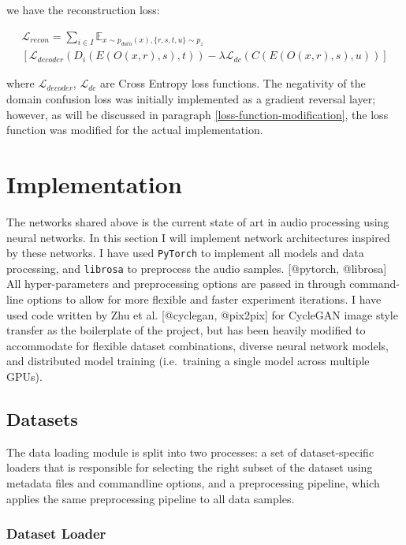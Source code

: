 \documentclass[12pt,a4paper,]{report}
\begin{document}
we have the reconstruction loss:

\begin{multline}
    \mathcal{L}_{recon} = \sum_{i \in I} \mathbb{E}_{x \sim p_{data}(x), \{r, s, t, u\} \sim p_{z}} \\
    [\mathcal{L}_{decoder}(D_i(E(O(x, r), s), t))  - \lambda \mathcal{L}_{dc}(C(E(O(x, r), s), u))] \label{eq:umtn}
\end{multline}

where \(\mathcal{L}_{decoder}\), \(\mathcal{L}_{dc}\) are Cross Entropy
loss functions. The negativity of the domain confusion loss was
initially implemented as a gradient reversal layer; however, as will be
discussed in paragraph \ref{loss-function-modification}, the loss
function was modified for the actual implementation.

\hypertarget{implementation}{%
\chapter{Implementation}\label{implementation}}

The networks shared above is the current state of art in audio
processing using neural networks. In this section I will implement
network architectures inspired by these networks. I have used
\texttt{PyTorch} to implement all models and data processing, and
\texttt{librosa} to preprocess the audio samples. {[}@pytorch,
@librosa{]} All hyper-parameters and preprocessing options are passed in
through command-line options to allow for more flexible and faster
experiment iterations. I have used code written by Zhu et al.
{[}@cyclegan, @pix2pix{]} for CycleGAN image style transfer as the
boilerplate of the project, but has been heavily modified to accommodate
for flexible dataset combinations, diverse neural network models, and
distributed model training (i.e.~training a single model across multiple
GPUs).

\hypertarget{datasets}{%
\section{Datasets}\label{datasets}}

The data loading module is split into two processes: a set of
dataset-specific loaders that is responsible for selecting the right
subset of the dataset using metadata files and commandline options, and
a preprocessing pipeline, which applies the same preprocessing pipeline
to all data samples.

\hypertarget{dataset-loader}{%
\subsection{Dataset Loader}\label{dataset-loader}}
\end{document}
